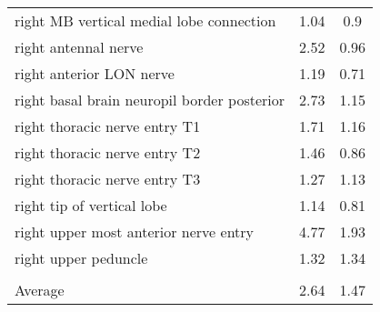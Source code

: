 \begin{tabular}{lcc}
 right MB vertical medial lobe connection    & 1.04          & 0.9              \\
 right antennal nerve                        & 2.52          & 0.96             \\
 right anterior LON nerve                    & 1.19          & 0.71             \\
 right basal brain neuropil border posterior & 2.73          & 1.15             \\
 right thoracic nerve entry T1               & 1.71          & 1.16             \\
 right thoracic nerve entry T2               & 1.46          & 0.86             \\
 right thoracic nerve entry T3               & 1.27          & 1.13             \\
 right tip of vertical lobe                  & 1.14          & 0.81             \\
 right upper most anterior nerve entry       & 4.77          & 1.93             \\
 right upper peduncle                        & 1.32          & 1.34             \\
                                             &               &                  \\
 Average                                     & 2.64          & 1.47             \\ \hline \hline
\hline
\end{tabular}